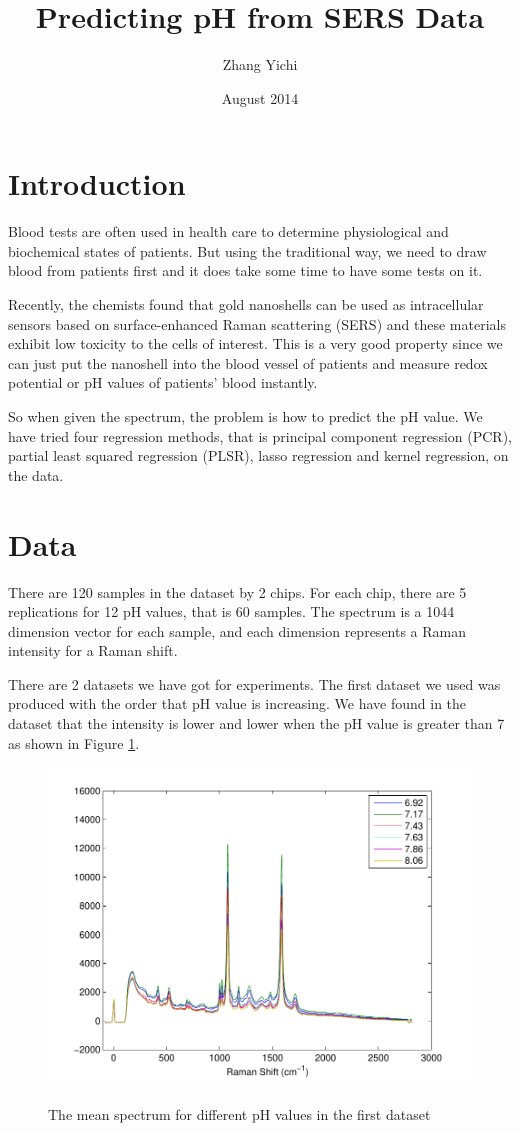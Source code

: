 \documentclass[a4paper]{article}
\begin{document}
\title{\textbf{Predicting pH from SERS Data}}
\author{Zhang Yichi}
\date{August 2014}
\maketitle

\section{Introduction}
Blood tests are often used in health care to determine physiological and biochemical states of patients. But using the traditional way, we need to draw blood from patients first and it does take some time to have some tests on it. 

Recently, the chemists found that gold nanoshells can be used as intracellular sensors based on surface-enhanced Raman scattering (SERS) and these materials exhibit low toxicity to the cells of interest. This is a very good property since we can just put the nanoshell into the blood vessel of patients and measure redox potential or pH values of patients' blood instantly.

So when given the spectrum, the problem is how to predict the pH value. We have tried four regression methods, that is principal component regression (PCR), partial least squared regression (PLSR), lasso regression and kernel regression, on the data.

\section{Data}
There are 120 samples in the dataset by 2 chips. For each chip, there are 5 replications for 12 pH values, that is 60 samples. The spectrum is a 1044 dimension vector for each sample, and each dimension represents a Raman intensity for a Raman shift.

There are 2 datasets we have got for experiments. The first dataset we used was produced with the order that pH value is increasing. We have found in the dataset that the intensity is lower and lower when the pH value is greater than 7 as shown in Figure \ref{pic1}.

\begin{figure}[h]
  \centering
  \includegraphics[width=.6\textwidth]{images/compare.pdf}\\
  \caption{The mean spectrum for different pH values in the first dataset}\label{pic1}
\end{figure}
\end{document}
